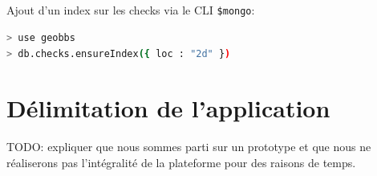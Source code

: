 \documentclass[a4paper,12pt]{report}
\begin{document}
\begin{onehalfspace}
\paragraph*{}
Ajout d'un index sur les checks via le CLI \lstinline{$mongo}:
\begin{lstlisting}[float=htb, language=bash, frame=lines, caption={Commandes à entrer dans le CLI mongo}, label={code:cliMongo}]
> use geobbs
> db.checks.ensureIndex({ loc : "2d" })
\end{lstlisting}

\chapter{Délimitation de l'application}
TODO: expliquer que nous sommes parti sur un prototype et que nous ne réaliserons pas l'intégralité de la plateforme pour des raisons de temps.

%
%
%
%
%
%
%
%








  \end{onehalfspace}
\end{document}
